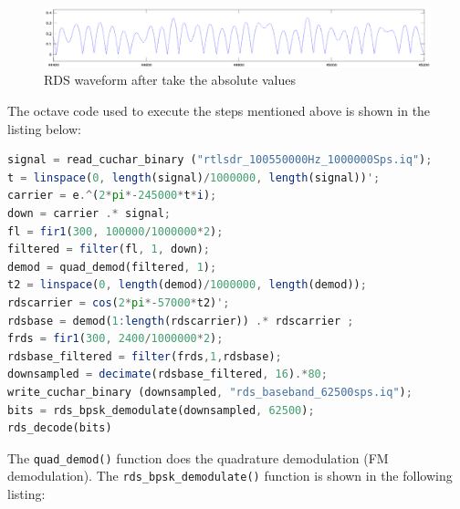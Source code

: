 \begin{figure}
	\centering
	\includegraphics[width=1.1\linewidth]{gfx/rds/rds_magnitude_waveform.png}
	\caption{RDS waveform after take the absolute values}
	\label{fig:rds_waveform}
\end{figure}

The octave code used to execute the steps mentioned above is shown in the
listing below:

\begin{lstlisting}[label=lst:octave_rds, caption=Octave implementation of the RDS demodulator, language=octave]
signal = read_cuchar_binary ("rtlsdr_100550000Hz_1000000Sps.iq");
t = linspace(0, length(signal)/1000000, length(signal))';
carrier = e.^(2*pi*-245000*t*i);
down = carrier .* signal;
fl = fir1(300, 100000/1000000*2);
filtered = filter(fl, 1, down);
demod = quad_demod(filtered, 1);
t2 = linspace(0, length(demod)/1000000, length(demod));
rdscarrier = cos(2*pi*-57000*t2)';
rdsbase = demod(1:length(rdscarrier)) .* rdscarrier ;
frds = fir1(300, 2400/1000000*2);
rdsbase_filtered = filter(frds,1,rdsbase);
downsampled = decimate(rdsbase_filtered, 16).*80;
write_cuchar_binary (downsampled, "rds_baseband_62500sps.iq");
bits = rds_bpsk_demodulate(downsampled, 62500);
rds_decode(bits)
\end{lstlisting}

The \texttt{quad\_demod()} function does the quadrature demodulation
(FM demodulation). The \texttt{rds\_bpsk\_demodulate()} function is shown
in the following listing:

